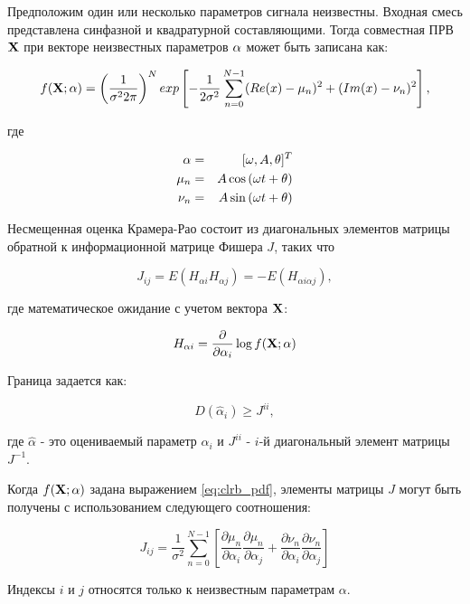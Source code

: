 Предположим один или несколько параметров сигнала неизвестны. Входная смесь представлена синфазной и квадратурной составляющими. Тогда совместная ПРВ ${\bf{X}}$
при векторе неизвестных параметров ${\bf{\alpha}}$  может быть записана как:
\begin{center}
\begin{equation}
	\label{eq:clrb_pdf}
	f({\bf{X}}; {\bf{\alpha}}) = \left( \frac{1}{\sigma^2 2 \pi} \right)^N exp \left[ -\frac{1}{2\sigma^2} \sum_{n=0}^{N-1} (Re(x)-\mu_n)^2 + (Im(x) - \nu_n)^2 \right],
\end{equation}
\end{center}
где
\begin{center}
\begin{eqnarray}
	\label{eq:clrb_alpha}
	{\bf{\alpha}} & = & [\omega, A, \theta]^T \\
	\mu_n & = & A \cos{(\omega t + \theta)} \\
	\nu_n & = & A \sin{(\omega t + \theta)}
\end{eqnarray}
\end{center}

Несмещенная оценка Крамера-Рао состоит из диагональных элементов матрицы обратной к информационной матрице Фишера ${J}$, таких что
\begin{center}
\begin{equation}
	\label{eq:crlb_Jij}
	J_{ij} = E(H_{\alpha i} H_{\alpha j}) = -E(H_{\alpha i \alpha j}),
\end{equation}
\end{center}
где математическое ожидание с учетом вектора ${\bf{X}}$:
\begin{center}
\begin{equation}
	\label{eq:crlb_H}
	H_{\alpha i} = \frac{\partial}{\partial \alpha_i} \log{f({\bf{X}}; {\bf{\alpha}})}
\end{equation}
\end{center}
Граница задается как:
\begin{center}
\begin{equation}
	\label{eq:crlb_var_alpha}
	D(\hat{\alpha}_i) \ge J^{ii},
\end{equation}
\end{center}
где ${\hat{\alpha}}$ - это оцениваемый параметр ${\alpha_i}$ и ${J^{ii}}$ - ${i}$-й диагональный элемент матрицы ${J^{-1}}$.

Когда ${f({\bf{X}}; {\bf{\alpha}})}$ задана выражением \ref{eq:clrb_pdf}, элементы матрицы ${J}$ могут быть получены с использованием следующего соотношения:
\begin{center}
\begin{equation}
	\label{eq:crlb_Jij_full}
	J_{ij} = \frac{1}{\sigma^2} \sum_{n=0}^{N-1} \left[ \frac{\partial \mu_n}{\partial \alpha_i} \frac{\partial \mu_n}{\partial \alpha_j} + \frac{\partial \nu_n}{\partial \alpha_i} \frac{\partial \nu_n}{\partial \alpha_j} \right]
\end{equation}
\end{center}
Индексы ${i}$ и ${j}$ относятся только к неизвестным параметрам ${\alpha}$.

